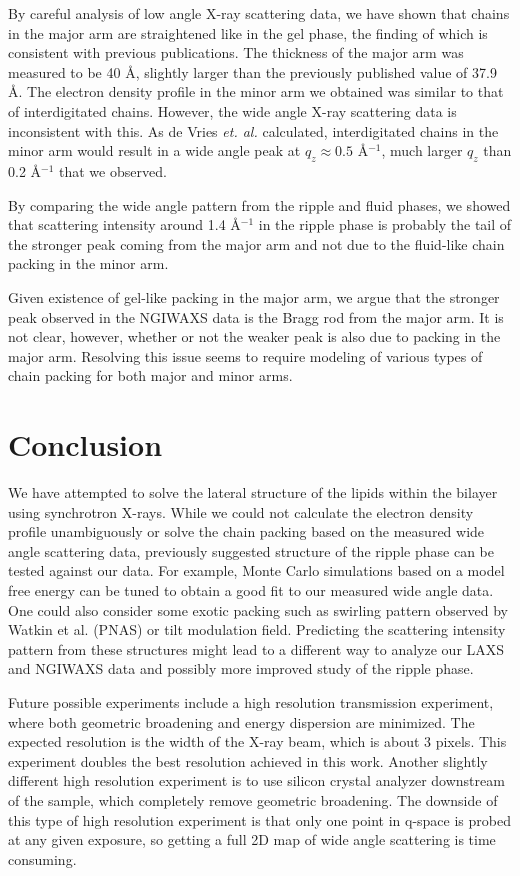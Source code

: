 By careful analysis of low angle X-ray scattering data, we have shown that
chains in the major arm are straightened like in the gel phase, the finding
of which is consistent with previous publications. The thickness of the major
arm was measured to be 40 \AA, slightly larger than the previously published 
value of 37.9 \AA \cite{ref:Sun96}. 
The electron density
profile in the minor arm we obtained was similar to that of interdigitated 
chains. However, the wide angle X-ray scattering data is inconsistent with
this. As de Vries \textit{et. al.} calculated, interdigitated chains in
the minor arm would result in a wide angle peak at $q_z \approx 0.5$ \AA$^{-1}$,
much larger $q_z$ than 0.2 \AA$^{-1}$ that we observed.

By comparing the wide angle pattern from the ripple and fluid phases,
we showed that scattering intensity around 1.4 \AA$^{-1}$ in the ripple phase
is probably the tail of the stronger peak coming from the major arm 
and not due to the fluid-like chain packing in the minor arm.
 
Given existence of gel-like packing in the major arm, we argue that the 
stronger peak observed in the NGIWAXS data is the Bragg rod from the 
major arm. It is not clear, however, whether or not the weaker peak is 
also due to packing in the major arm. Resolving this issue seems to require
modeling of various types of chain packing for both major and minor arms.
 
\section{Conclusion}
We have attempted to solve the lateral structure of the lipids within the
bilayer using synchrotron X-rays. 
While we could not calculate the electron density profile unambiguously
or solve the chain packing based on the measured wide angle scattering data, 
previously suggested structure of the ripple phase can be tested against
our data.
For example, Monte Carlo simulations based on a model free energy can be tuned
to obtain a good fit to our measured wide angle data.
One could also consider some exotic packing such as swirling pattern observed
by Watkin et al. (PNAS) or tilt modulation field. Predicting the scattering
intensity pattern from these structures might lead to a different way
to analyze our LAXS and NGIWAXS data and possibly more improved study of the 
ripple phase. 

Future possible experiments
include a high resolution transmission experiment, where both geometric 
broadening and energy dispersion are minimized. The expected resolution 
is the width of the X-ray beam, which is about 3 pixels. This experiment 
doubles the best resolution achieved in this work. 
Another slightly different high resolution experiment is to use silicon 
crystal analyzer downstream of the sample, which completely remove geometric
broadening. The downside of this type of high resolution experiment is that
only one point in q-space is probed at any given exposure, so getting a full
2D map of wide angle scattering is time consuming.  

